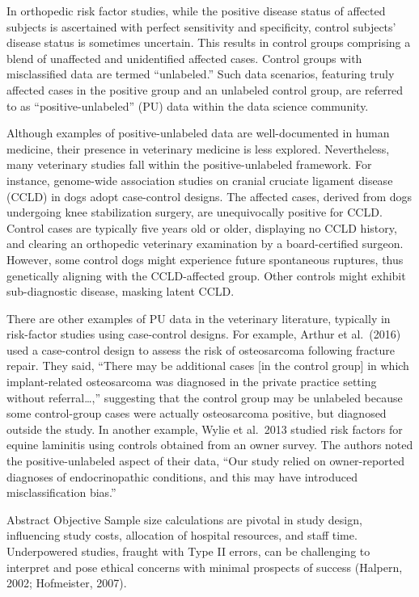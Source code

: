 \documentclass[
]{article}
\begin{document}
In orthopedic risk factor studies, while the positive disease status of
affected subjects is ascertained with perfect sensitivity and
specificity, control subjects' disease status is sometimes uncertain.
This results in control groups comprising a blend of unaffected and
unidentified affected cases. Control groups with misclassified data are
termed ``unlabeled.'' Such data scenarios, featuring truly affected
cases in the positive group and an unlabeled control group, are referred
to as ``positive-unlabeled'' (PU) data within the data science
community.

Although examples of positive-unlabeled data are well-documented in
human medicine, their presence in veterinary medicine is less explored.
Nevertheless, many veterinary studies fall within the positive-unlabeled
framework. For instance, genome-wide association studies on cranial
cruciate ligament disease (CCLD) in dogs adopt case-control designs. The
affected cases, derived from dogs undergoing knee stabilization surgery,
are unequivocally positive for CCLD. Control cases are typically five
years old or older, displaying no CCLD history, and clearing an
orthopedic veterinary examination by a board-certified surgeon. However,
some control dogs might experience future spontaneous ruptures, thus
genetically aligning with the CCLD-affected group. Other controls might
exhibit sub-diagnostic disease, masking latent CCLD. \cite{wrehim08}

There are other examples of PU data in the veterinary literature,
typically in risk-factor studies using case-control designs. For
example, Arthur et al.~(2016) used a case-control design to assess the
risk of osteosarcoma following fracture repair. \cite{aakj16} They said,
``There may be additional cases {[}in the control group{]} in which
implant-related osteosarcoma was diagnosed in the private practice
setting without referral\ldots,'' suggesting that the control group may
be unlabeled because some control-group cases were actually osteosarcoma
positive, but diagnosed outside the study. In another example, Wylie et
al.~2013 studied risk factors for equine laminitis using controls
obtained from an owner survey. \cite{wcvj13} The authors noted the
positive-unlabeled aspect of their data, ``Our study relied on
owner-reported diagnoses of endocrinopathic conditions, and this may
have introduced misclassification bias.''

Abstract Objective Sample size calculations are pivotal in study design,
influencing study costs, allocation of hospital resources, and staff
time. Underpowered studies, fraught with Type II errors, can be
challenging to interpret and pose ethical concerns with minimal
prospects of success (Halpern, 2002; Hofmeister, 2007).
\end{document}
